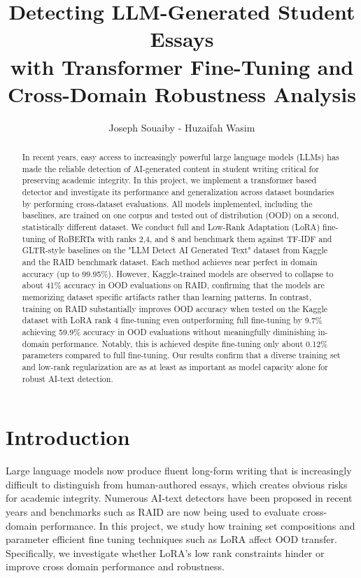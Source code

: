 \documentclass{article}
\title{Detecting LLM-Generated Student Essays\\with Transformer Fine-Tuning and Cross-Domain Robustness Analysis}
\author{Joseph Souaiby - Huzaifah Wasim}
\begin{document}
\maketitle

\begin{abstract}
    In recent years, easy access to increasingly powerful large language models (LLMs) has made the reliable detection of AI-generated content in student writing critical for preserving academic integrity. In this project, we implement a transformer based detector and investigate its performance and generalization across dataset boundaries by performing cross-dataset evaluations. All models implemented, including the baselines, are trained on one corpus and tested out of distribution (OOD) on a second, statistically different dataset. We conduct full and Low-Rank Adaptation (LoRA) fine-tuning of RoBERTa with ranks 2,4, and 8 and benchmark them against TF-IDF and GLTR-style baselines on the "LLM Detect AI Generated Text" dataset from Kaggle and the RAID benchmark dataset. Each method achieves near perfect in domain accuracy (up to 99.95\%). However, Kaggle-trained models are observed to collapse to about 41\% accuracy in OOD evaluations on RAID, confirming that the models are memorizing dataset specific artifacts rather than learning patterns. In contrast, training on RAID substantially improves OOD accuracy when tested on the Kaggle dataset with LoRA rank 4 fine-tuning even outperforming full fine-tuning by 9.7\% achieving 59.9\% accuracy in OOD evaluations without meaningfully diminishing in-domain performance. Notably, this is achieved despite fine-tuning only about 0.12\% parameters compared to full fine-tuning. Our results confirm that a diverse training set and low-rank regularization are as at least as important as model capacity alone for robust AI-text detection.
\end{abstract}

\section{Introduction}
Large language models now produce fluent long-form writing that is increasingly difficult to distinguish from human-authored essays, which creates obvious risks for academic integrity. Numerous AI-text detectors have been proposed in recent years and benchmarks such as RAID \citep{dugan2024raid} are now being used to evaluate cross-domain performance. In this project, we study how training set compositions and parameter efficient fine tuning techniques such as LoRA affect OOD transfer. Specifically, we investigate whether LoRA's low rank constraints hinder or improve cross domain performance and robustness.
\end{document}
